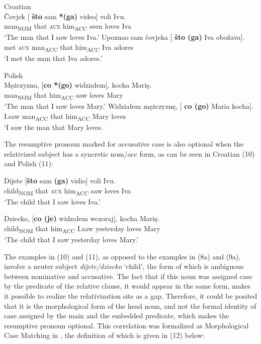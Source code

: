 \documentclass[output=paper]{langsci/langscibook}
\begin{document}
\ea%
    Croatian\label{ex:leska:8}\\
    \ea
    \gll Čovjek   [  \textbf{što}   sam \textbf{*(ga)}   video]   voli   Ivu.\\
          man\textsubscript{NOM}   that \textsc{aux}   him\textsubscript{ACC}   seen   loves   Iva\\
    \glt ‘The man that I saw loves Iva.’
    \ex
    \gll Upoznao   sam čovjeka [  \textbf{što (ga)}   Iva obožava].\\
         met   \textsc{aux} man\textsubscript{ACC}   that him\textsubscript{ACC} Iva adores\\
    \glt ‘I met the man that Iva adores.’
    \z
\z    

\ea%
    Polish\label{ex:leska:9}\\
    \ea
    \gll Mężczyzna, [\textbf{co *(go)}   widziałem],   kocha   Marię.\\
         man\textsubscript{NOM}   that him\textsubscript{ACC}   saw     loves   Mary\\
    \glt ‘The man that I saw loves Mary.’
    \ex
    \gll Widziałem   mężczyznę, [  \textbf{co (go)}   Maria   kocha]. \\
          I.saw     man\textsubscript{ACC}   that him\textsubscript{ACC}   Mary   loves\\
    \glt ‘I saw the man that Mary loves.
    \z
\z
          
The resumptive pronoun marked for accusative case is also optional when the relativized subject has a syncretic nom/acc form, as can be seen in Croatian (10) and Polish (11): 

\ea%
    \label{ex:leska:10}
    \gll Dijete   [\textbf{što} sam \textbf{(ga)}   vidio]   voli   Ivu.\\
         child\textsubscript{NOM}   that \textsc{aux} him\textsubscript{ACC}   saw   loves   Iva\\
    \glt ‘The child that I saw loves Iva.’
    \z

\ea%
    \label{ex:leska:11}
    \gll Dziecko, [\textbf{co (je)}   widzałem   wczoraj],   kocha   Marię.\\
         child\textsubscript{NOM} that him\textsubscript{ACC}  I.saw   yesterday   loves   Mary\\
    \glt ‘The child that I saw yesterday loves Mary.’
    \z

The examples in (10) and (11), as opposed to the examples in (8a) and (9a), involve a neuter subject \textit{dijete/dziecko} ‘child’, the form of which is ambiguous between nominative and accusative. The fact that if this noun was assigned case by the predicate of the relative clause, it would appear in the same form, makes it possible to realize the relativization site as a gap. Therefore, it could be posited that it is the morphological form of the head noun, and not the formal identity of case assigned by the main and the embedded predicate, which makes the resumptive pronoun optional. This correlation was formalized as Morphological Case Matching in \citet[30]{Gračanin-Yuksek2013}, the definition of which is given in (12) below: 
\end{document}
